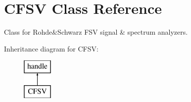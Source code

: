 \hypertarget{class_c_f_s_v}{\section{C\-F\-S\-V Class Reference}
\label{class_c_f_s_v}
}


Class for Rohde\&Schwarz F\-S\-V signal \& spectrum analyzers.  


Inheritance diagram for C\-F\-S\-V\-:\begin{figure}[H]
\begin{center}
\leavevmode
\includegraphics[height=2.000000cm]{class_c_f_s_v}
\end{center}
\end{figure}
